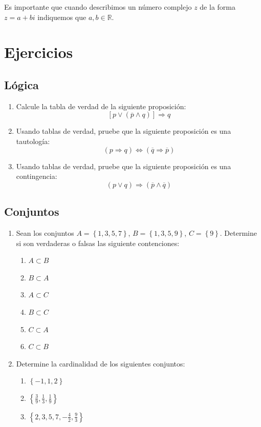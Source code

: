 \documentclass[11pt, twoside]{book}
\newcommand{\set}[1]{\left\lbrace #1 \right\rbrace}
\begin{document}
\begin{note}
    Es importante que cuando describimos un número complejo \(z\) de la forma \(z=a+bi\) indiquemos que \(a,b\in\mathbb{R}\).
\end{note}

\newpage
\section{Ejercicios}
\subsection*{Lógica}
\begin{enumerate}
    \item Calcule la tabla de verdad de la siguiente proposición:
            \[\left[p\vee(\overline{p}\wedge q)\right]\Rightarrow q\]
    \item Usando tablas de verdad, pruebe que la siguiente proposición es una tautología:
        \[\left(p\Rightarrow q\right) \iff \left(\overline{q}\Rightarrow \overline{p}\right)\]
    \item Usando tablas de verdad, pruebe que la siguiente proposición es una contingencia:
        \[(p\vee q) \Rightarrow (\overline{p}\wedge \overline{q})\] 
\end{enumerate}
\subsection*{Conjuntos}
\begin{enumerate}
    \item Sean los conjuntos \(A=\set{1,3,5,7}\), \(B=\set{1,3,5,9}\), \(C=\set{9}\).
        Determine si son verdaderas o falsas las siguiente contenciones:
        \begin{multicols}{2}
        \begin{enumerate}[label=\alph*)]
            \item \(A\subset B\)
            \item \(B\subset A\)
            \item \(A\subset C\)
            \item \(B\subset C\)
            \item \(C\subset A\)
            \item \(C\subset B\)
        \end{enumerate}
        \end{multicols}
    \item Determine la cardinalidad de los siguientes conjuntos:
        \begin{enumerate}[label=\alph*)]
            \item \(\set{-1, 1,2}\)
            \item \(\set{\frac39,\frac13,\frac19}\)
            \item \(\set{2,3,5,7,-\frac42,\frac93}\)
        \end{enumerate}
\end{enumerate}
\end{document}
